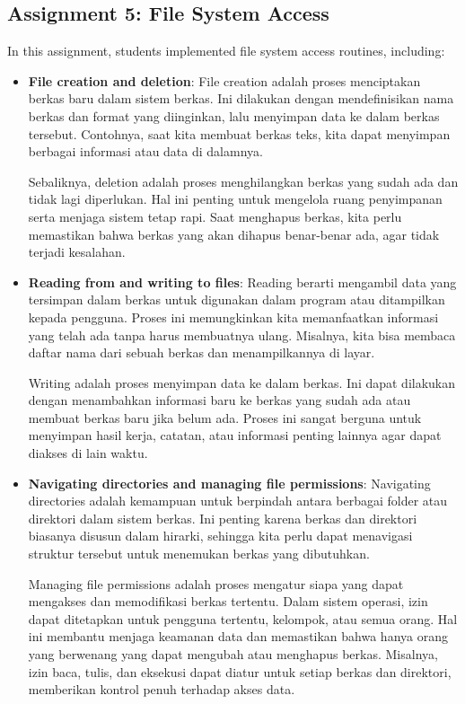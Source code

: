 \documentclass[12pt]{article}
\begin{document}
\subsection{Assignment 5: File System Access}
In this assignment, students implemented file system access routines, including:
\begin{itemize}
    \item \textbf{File creation and deletion}: File creation adalah proses menciptakan berkas baru dalam sistem berkas. Ini dilakukan dengan mendefinisikan nama berkas dan format yang diinginkan, lalu menyimpan data ke dalam berkas tersebut. Contohnya, saat kita membuat berkas teks, kita dapat menyimpan berbagai informasi atau data di dalamnya.
    
    Sebaliknya, deletion adalah proses menghilangkan berkas yang sudah ada dan tidak lagi diperlukan. Hal ini penting untuk mengelola ruang penyimpanan serta menjaga sistem tetap rapi. Saat menghapus berkas, kita perlu memastikan bahwa berkas yang akan dihapus benar-benar ada, agar tidak terjadi kesalahan.
    
    \item \textbf{Reading from and writing to files}: Reading berarti mengambil data yang tersimpan dalam berkas untuk digunakan dalam program atau ditampilkan kepada pengguna. Proses ini memungkinkan kita memanfaatkan informasi yang telah ada tanpa harus membuatnya ulang. Misalnya, kita bisa membaca daftar nama dari sebuah berkas dan menampilkannya di layar.
    
    Writing adalah proses menyimpan data ke dalam berkas. Ini dapat dilakukan dengan menambahkan informasi baru ke berkas yang sudah ada atau membuat berkas baru jika belum ada. Proses ini sangat berguna untuk menyimpan hasil kerja, catatan, atau informasi penting lainnya agar dapat diakses di lain waktu.
    
    \item \textbf{Navigating directories and managing file permissions}: Navigating directories adalah kemampuan untuk berpindah antara berbagai folder atau direktori dalam sistem berkas. Ini penting karena berkas dan direktori biasanya disusun dalam hirarki, sehingga kita perlu dapat menavigasi struktur tersebut untuk menemukan berkas yang dibutuhkan.
    
    Managing file permissions adalah proses mengatur siapa yang dapat mengakses dan memodifikasi berkas tertentu. Dalam sistem operasi, izin dapat ditetapkan untuk pengguna tertentu, kelompok, atau semua orang. Hal ini membantu menjaga keamanan data dan memastikan bahwa hanya orang yang berwenang yang dapat mengubah atau menghapus berkas. Misalnya, izin baca, tulis, dan eksekusi dapat diatur untuk setiap berkas dan direktori, memberikan kontrol penuh terhadap akses data.


\end{itemize}
\end{document}
